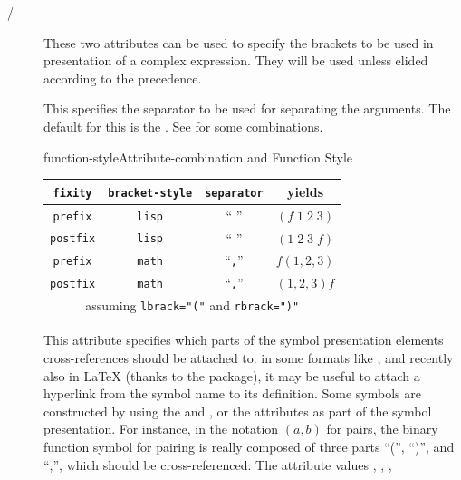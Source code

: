 \begin{description}
\item[{}/{}]
  These two attributes can be used to specify the brackets to be used in
  presentation of a complex expression.  They will be used unless elided according
  to the precedence.
\item[{}] This specifies the separator to
  be used for separating the arguments. The default for this is the
  {}. See {} for some combinations.
  \begin{myfig}{function-style}{Attribute-combination and Function Style}
  \begin{tabular}{|c|c|c||c|}\hline
     {\tt{fixity}}  & {\tt{bracket-style}}  & {\tt{separator}}  & yields       \\\hline\hline
     {\tt{prefix}}  & {\tt{lisp}} & `` '' & $ (f\; 1\; 2\; 3)$ \\\hline
     {\tt{postfix}} & {\tt{lisp}} & `` '' & $(1\; 2\; 3\; f)$  \\\hline
     {\tt{prefix}}  & {\tt{math}} & ``{\tt{,}}'' &$f(1,2,3)$  \\\hline
     {\tt{postfix}} & {\tt{math}} & ``{\tt{,}}'' &$(1,2,3)f$ \\\hline\hline
     \multicolumn{4}{|c|}{assuming {\tt{lbrack="("}} and {\tt{rbrack=")"}}}\\\hline
  \end{tabular}
  \end{myfig}
\item[{}] This attribute specifies
  which parts of the symbol presentation elements cross-references should be
  attached to: in some formats like {\html}, and recently also in {\LaTeX} (thanks
  to the {} package), it may be useful to attach a hyperlink
  from the symbol name to its definition.  Some symbols are constructed by using
  the {} and {},
  or the {} attributes as part of the symbol
  presentation. For instance, in the notation $(a,b)$ for pairs, the binary
  function symbol for pairing is really composed of three parts ``('', ``)'', and
  ``,'', which should be cross-referenced. The attribute values
  {},
  {},
  {},

\end{description}
